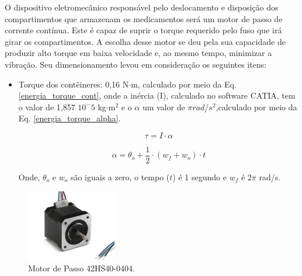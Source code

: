  O dispositivo eletromecânico responsável pelo deslocamento e disposição dos compartimentos que armazenam os medicamentos será um motor de passo de corrente contínua. Este é capaz de suprir o torque requerido pelo fuso que irá girar os compartimentos. A escolha desse motor se deu pela sua capacidade de produzir alto torque em baixa velocidade e, ao mesmo tempo, minimizar a vibração. Seu dimensionamento levou em consideração os seguintes itens: 

\begin{itemize}
    \item Torque dos contêineres: 0,16 N$\cdot$m, calculado por meio da Eq. \ref{energia_torque_cont}, onde a inércia (I), calculado no software CATIA, tem o valor de 1,857 $10^-5$ kg$\cdot$m$^2$ e o $\alpha $ um valor de $\pi${$rad$}/{$s^2$},calculado por meio da Eq. \ref{energia_torque_alpha}.

    \begin{equation}
        \tau = I \cdot \alpha
        \label{energia_torque_cont}
    \end{equation}

        \begin{equation}
        \alpha = \theta_{o} + \frac{1}{2} \cdot (w_{f} + w_{o}) \cdot t
        \label{energia_torque_alpha}
    \end{equation}
    
    Onde, $\theta_{o}$ e $w_{o}$ são iguais a zero, o tempo ($t$) é 1 segundo e $w_f$ é 2$\pi$ rad/s.
   

    
\end{itemize}

 \begin{figure}[H]
\centering
    \includegraphics[width=0.35\textwidth]{figuras/energia/fotos_componentes/Energia_passo.png}
    \caption{Motor de Passo 42HS40-0404.}
    \label{fig:energia_passo}
\end{figure}


